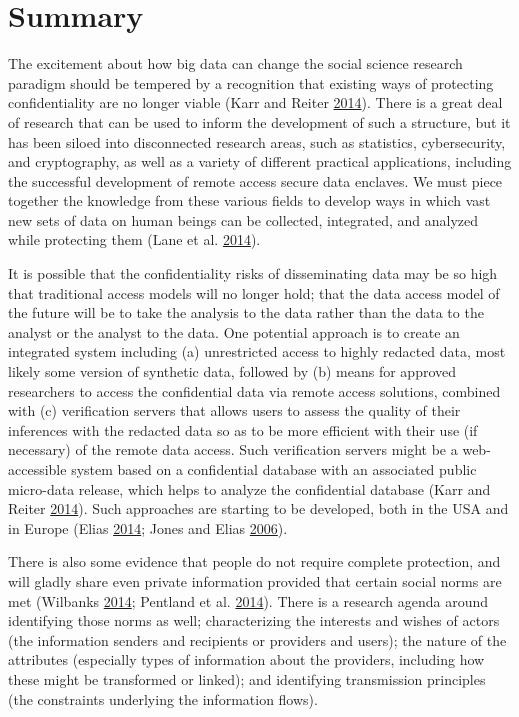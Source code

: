 \documentclass[]{krantz}
\begin{document}
\section{Summary}\label{summary-6}

The excitement about how big data can change the social science research
paradigm should be tempered by a recognition that existing ways of
protecting confidentiality are no longer viable (Karr and Reiter
\protect\hyperlink{ref-karr2014analytical}{2014}). There is a great deal
of research that can be used to inform the development of such a
structure, but it has been siloed into disconnected research areas, such
as statistics, cybersecurity, and cryptography, as well as a variety of
different practical applications, including the successful development
of remote access secure data enclaves. We must piece together the
knowledge from these various fields to develop ways in which vast new
sets of data on human beings can be collected, integrated, and analyzed
while protecting them (Lane et al.
\protect\hyperlink{ref-lane2014}{2014}).

It is possible that the confidentiality risks of disseminating data may
be so high that traditional access models will no longer hold; that the
data access model of the future will be to take the analysis to the data
rather than the data to the analyst or the analyst to the data. One
potential approach is to create an integrated system including (a)
unrestricted access to highly redacted data, most likely some version of
synthetic data, followed by (b) means for approved researchers to access
the confidential data via remote access solutions, combined with (c)
verification servers that allows users to assess the quality of their
inferences with the redacted data so as to be more efficient with their
use (if necessary) of the remote data access. Such verification servers
might be a web-accessible system based on a confidential database with
an associated public micro-data release, which helps to analyze the
confidential database (Karr and Reiter
\protect\hyperlink{ref-karr2014analytical}{2014}). Such approaches are
starting to be developed, both in the USA and in Europe (Elias
\protect\hyperlink{ref-Elias2014}{2014}; Jones and Elias
\protect\hyperlink{ref-jones2006administrative}{2006}).

There is also some evidence that people do not require complete
protection, and will gladly share even private information provided that
certain social norms are met (Wilbanks
\protect\hyperlink{ref-Wilbanks2014}{2014}; Pentland et al.
\protect\hyperlink{ref-Pentland2014}{2014}). There is a research agenda
around identifying those norms as well; characterizing the interests and
wishes of actors (the information senders and recipients or providers
and users); the nature of the attributes (especially types of
information about the providers, including how these might be
transformed or linked); and identifying transmission principles (the
constraints underlying the information flows).
\end{document}
